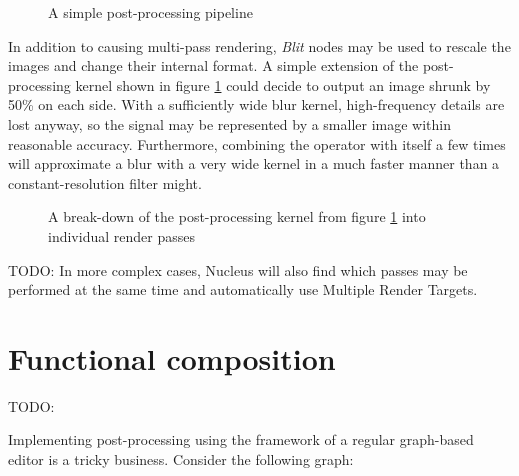 \begin{figure}[h!]
  \centering
    \caption[Simple post-processing]{A simple post-processing pipeline}
  \label{fig:SimplePostProc}
\end{figure}

In addition to causing multi-pass rendering, \emph{Blit} nodes may be used to rescale the images and change their internal format. A simple extension of the post-processing kernel shown in figure \ref{fig:SimplePostProc} could decide to output an image shrunk by 50\% on each side. With a sufficiently wide blur kernel, high-frequency details are lost anyway, so the signal may be represented by a smaller image within reasonable accuracy. Furthermore, combining the operator with itself a few times will approximate a blur with a very wide kernel in a much faster manner than a constant-resolution filter might.

\begin{figure}[h!]
  \centering
    \caption[Simple post-processing breakdown]{A break-down of the post-processing kernel from figure \ref{fig:SimplePostProc} into individual render passes}
  \label{fig:SimplePostProcBreakdown}
\end{figure}

TODO: In more complex cases, Nucleus will also find which passes may be performed at the same time and automatically use Multiple Render Targets.

\section{Functional composition}

TODO: 


Implementing post-processing using the framework of a regular graph-based editor is a tricky business. Consider the following graph:

